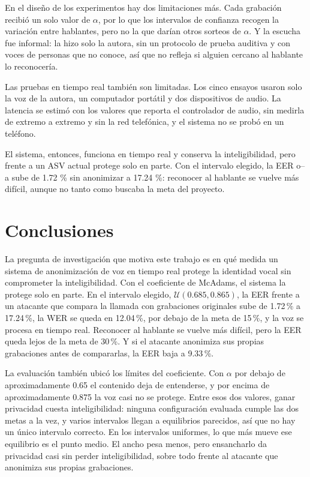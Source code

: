 \documentclass[10pt,twocolumn]{article}
\begin{document}
En el diseño de los experimentos hay dos limitaciones más. Cada grabación recibió un solo valor de $\alpha$, por lo que los intervalos de confianza recogen la variación entre hablantes, pero no la que darían otros sorteos de $\alpha$. Y la escucha fue informal: la hizo solo la autora, sin un protocolo de prueba auditiva y con voces de personas que no conoce, así que no refleja si alguien cercano al hablante lo reconocería.

Las pruebas en tiempo real también son limitadas. Los cinco ensayos usaron solo la voz de la autora, un computador portátil y dos dispositivos de audio. La latencia se estimó con los valores que reporta el controlador de audio, sin medirla de extremo a extremo y sin la red telefónica, y el sistema no se probó en un teléfono.

El sistema, entonces, funciona en tiempo real y conserva la inteligibilidad, pero frente a un ASV actual protege solo en parte. Con el intervalo elegido, la EER o--a sube de 1.72 \% sin anonimizar a 17.24 \%: reconocer al hablante se vuelve más difícil, aunque no tanto como buscaba la meta del proyecto.



\FloatBarrier


\section{Conclusiones}\label{sec:6}

La pregunta de investigación que motiva este trabajo es en qué medida un sistema de anonimización de voz en tiempo real protege la identidad vocal sin comprometer la inteligibilidad. Con el coeficiente de McAdams, el sistema la protege solo en parte. En el intervalo elegido, $\mathcal{U}(0.685,0.865)$, la EER frente a un atacante que compara la llamada con grabaciones originales sube de 1.72\,\% a 17.24\,\%, la WER se queda en 12.04\,\%, por debajo de la meta de 15\,\%, y la voz se procesa en tiempo real. Reconocer al hablante se vuelve más difícil, pero la EER queda lejos de la meta de 30\,\%. Y si el atacante anonimiza sus propias grabaciones antes de compararlas, la EER baja a 9.33\,\%.

La evaluación también ubicó los límites del coeficiente. Con $\alpha$ por debajo de aproximadamente 0.65 el contenido deja de entenderse, y por encima de aproximadamente 0.875 la voz casi no se protege. Entre esos dos valores, ganar privacidad cuesta inteligibilidad: ninguna configuración evaluada cumple las dos metas a la vez, y varios intervalos llegan a equilibrios parecidos, así que no hay un único intervalo correcto. En los intervalos uniformes, lo que más mueve ese equilibrio es el punto medio. El ancho pesa menos, pero ensancharlo da privacidad casi sin perder inteligibilidad, sobre todo frente al atacante que anonimiza sus propias grabaciones.
\end{document}
